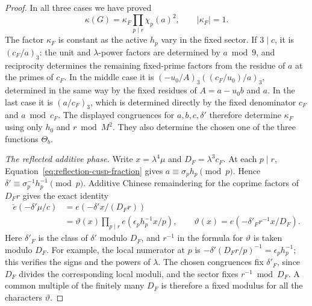 \documentclass[11pt,a4paper]{article}
\numberwithin{equation}{section}
\numberwithin{figure}{section}
\theoremstyle{definition}
\theoremstyle{remark}
\begin{document}
\begin{proof}
In all three cases we have proved
\begin{equation}\label{eq:reflection-multiplier}
 \kappa(G)=\kappa_F\prod_{p\mid r}\chi_p(a)^2,
 \qquad |\kappa_F|=1.
\end{equation}
The factor $\kappa_F$ is constant as the active $h_p$ vary in the
fixed sector.  If $3\mid c$, it is $(c_F/a)_3$: the unit and
$\lambda$-power factors are determined by $a\bmod9$, and reciprocity
determines the remaining fixed-prime factors from the residue of $a$ at
the primes of $c_F$.  In the middle case it is
$(-u_0/A)_3((c_F/u_0)/a)_3$, determined in the same way by the fixed
residues of $A=a-u_0b$ and $a$.  In the last case it is $(a/c_F)_3$,
which is determined directly by the fixed denominator $c_F$ and
$a\bmod c_F$.  The displayed congruences for $a,b,c,\delta'$ therefore
determine $\kappa_F$ using only $h_0$ and $r\bmod M^2$.
They also determine the chosen one of the three functions $\Theta_b$.

\emph{The reflected additive phase.}
Write $x=\lambda^4\mu$ and $D_F=\lambda^3c_F$.  At each $p\mid r$,
Equation~\eqref{eq:reflection-cusp-fraction} gives
$a\equiv\sigma_ph_p\pmod p$.  Hence
$\delta'\equiv\sigma_p^{-1}h_p^{-1}\pmod p$.  Additive Chinese
remaindering for the coprime factors of $D_Fr$ gives the exact identity
\begin{equation}\label{eq:reflection-additive-phase}
 \begin{split}
 \check e(-\delta'\mu/c)
 &=e(-\delta'x/(D_Fr))\\
 &=\vartheta(x)\prod_{p\mid r}e(\epsilon_ph_p^{-1}x/p),
 \qquad
 \vartheta(x)=e(-\delta'_F r^{-1}x/D_F).
 \end{split}
\end{equation}
Here $\delta'_F$ is the class of $\delta'$ modulo $D_F$, and
$r^{-1}$ in the formula for $\vartheta$ is taken modulo $D_F$.
For example, the local numerator at $p$ is
$-\delta'(D_Fr/p)^{-1}=\epsilon_ph_p^{-1}$; this verifies the signs
and the powers of $\lambda$.  The chosen congruences fix $\delta'_F$,
since $D_F$ divides the corresponding local moduli, and the sector fixes
$r^{-1}\bmod D_F$.  A common multiple of the finitely many $D_F$ is
therefore a fixed modulus for all the characters $\vartheta$.


\end{proof}
\end{document}
